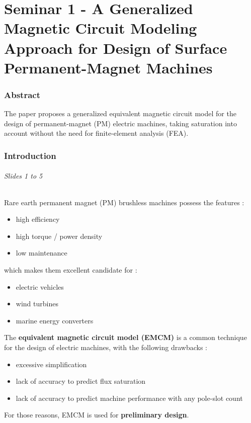 \part{Seminar 1 - A Generalized Magnetic Circuit Modeling Approach for Design of Surface Permanent-Magnet Machines}


\section*{Abstract}
The paper proposes a generalized equivalent magnetic circuit model for the design of permanent-magnet (PM) electric machines, taking saturation into account without the need for finite-element analysis (FEA).

\section{Introduction}
\paragraph{Slides 1 to 5} Rare earth permanent magnet (PM) brushless machines possess the features :
\begin{itemize}
    \item high efficiency
    \item high torque / power density
    \item low maintenance
\end{itemize}
which makes them excellent candidate for :
\begin{itemize}
    \item electric vehicles
    \item wind turbines
    \item marine energy converters
\end{itemize}
The \textbf{equivalent magnetic circuit model (EMCM)} is a common technique for the design of electric machines, with the following drawbacks :
\begin{itemize}
    \item excessive simplification
    \item lack of accuracy to predict flux saturation
    \item lack of accuracy to predict machine performance with any pole-slot count
\end{itemize}
For those reasons, EMCM is used for \textbf{preliminary design}.


